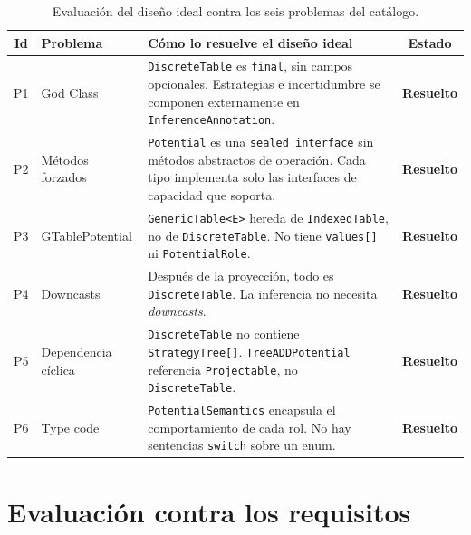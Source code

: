 \documentclass[11pt,a4paper]{article}
\newcommand{\code}[1]{\texttt{#1}}
\newcommand{\good}[1]{\textcolor{codegreen}{\textbf{#1}}}
\begin{document}
\begin{table}[H]
\centering
\small
\setlength{\tabcolsep}{4pt}
\begin{tabular}{clp{8cm}c}
\toprule
\textbf{Id} & \textbf{Problema} & \textbf{Cómo lo resuelve el diseño ideal} & \textbf{Estado} \\
\midrule
\rowcolor{lightgray}
P1 & God Class &
  \code{DiscreteTable} es \code{final}, sin campos opcionales.
  Estrategias e incertidumbre se componen externamente en
  \code{InferenceAnnotation}. &
  \good{Resuelto} \\

P2 & Métodos forzados &
  \code{Potential} es una \code{sealed interface} sin métodos abstractos
  de operación.  Cada tipo implementa solo las interfaces de capacidad
  que soporta. &
  \good{Resuelto} \\

\rowcolor{lightgray}
P3 & GTablePotential &
  \code{GenericTable<E>} hereda de \code{IndexedTable}, no de
  \code{DiscreteTable}.  No tiene \code{values[]} ni \code{PotentialRole}. &
  \good{Resuelto} \\

P4 & Downcasts &
  Después de la proyección, todo es \code{DiscreteTable}.  La inferencia
  no necesita \emph{downcasts}. &
  \good{Resuelto} \\

\rowcolor{lightgray}
P5 & Dependencia cíclica &
  \code{DiscreteTable} no contiene \code{StrategyTree[]}.
  \code{TreeADDPotential} referencia \code{Projectable}, no
  \code{DiscreteTable}. &
  \good{Resuelto} \\

P6 & Type code &
  \code{PotentialSemantics} encapsula el comportamiento de cada rol.
  No hay sentencias \code{switch} sobre un enum. &
  \good{Resuelto} \\
\bottomrule
\end{tabular}
\caption{Evaluación del diseño ideal contra los seis problemas del catálogo.}
\label{tab:ideal-evaluacion}
\end{table}

\section{Evaluación contra los requisitos}
\label{sec:ideal-eval-req}
\end{document}
